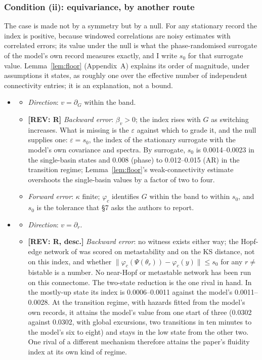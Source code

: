 \documentclass[11pt]{article}
\newcommand{\REV}[1]{\textcolor{purple!70!black}{\textbf{[REV: #1]}}}
\begin{document}
\subsubsection{Condition (ii): equivariance, by another route}
The case is made not by a symmetry but by a null. For any stationary record the index is positive, because windowed correlations are noisy estimates with correlated errors; its value under the null is what the phase-randomised surrogate of the model's own record measures exactly, and I write $s_0$ for that surrogate value. Lemma~\ref{lem:floor} (Appendix~A) explains its order of magnitude, under assumptions it states, as roughly one over the effective number of independent connectivity entries; it is an explanation, not a bound.
\begin{itemize}
\item[$\Theta_1$]
  \begin{itemize}
  \item \emph{Direction}: $v=\partial_G$ within the band.
  \item \REV{R} \emph{Backward error}: $\beta_v>0$; the index rises with $G$ as switching increases. What is missing is the $\varepsilon$ against which to grade it, and the null supplies one: $\varepsilon=s_0$, the index of the stationary surrogate with the model's own covariance and spectra. By surrogate, $s_0$ is 0.0014--0.0023 in the single-basin states and 0.008 (phase) to 0.012--0.015 (AR) in the transition regime; Lemma~\ref{lem:floor}'s weak-connectivity estimate overshoots the single-basin values by a factor of two to four.
  \item \emph{Forward error}: $\kappa$ finite; $\varphi_c$ identifies $G$ within the band to within $s_0$, and $s_0$ is the tolerance that \S7 asks the authors to report.
  \end{itemize}
\item[$\Theta_2$]
  \begin{itemize}
  \item \emph{Direction}: $v=\partial_r$.
  \item \REV{R, desc.} \emph{Backward error}: no witness exists either way; the Hopf-edge network of \textcite{deco2017} was scored on metastability and on the KS distance, not on this index, and whether $\|\varphi_c(\Psi(\theta_r))-\varphi_c(y)\|\le s_0$ for any $r\ne$ bistable is a number. No near-Hopf or metastable network has been run on this connectome. The two-state reduction is the one rival in hand. In the mostly-up state its index is 0.0006--0.0011 against the model's 0.0011--0.0028. At the transition regime, with hazards fitted from the model's own records, it attains the model's value from one start of three (0.0302 against 0.0302, with global excursions, two transitions in ten minutes to the model's six to eight) and stays in the low state from the other two. One rival of a different mechanism therefore attains the paper's fluidity index at its own kind of regime.

\end{itemize}
\end{itemize}
\end{document}
